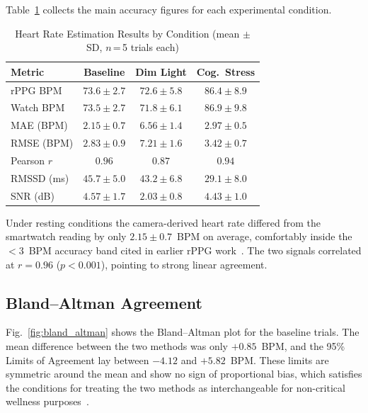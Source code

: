 \documentclass[conference]{IEEEtran}
\begin{document}
Table~\ref{tab:results} collects the main accuracy figures for each
experimental condition.

\begin{table}[!t]
  \centering
  \caption{Heart Rate Estimation Results by Condition
           (mean $\pm$ SD, $n$\,=\,5 trials each)}
  \label{tab:results}
  \renewcommand{\arraystretch}{1.3}
  \begin{tabular}{@{}lccc@{}}
    \toprule
    \textbf{Metric}
      & \textbf{Baseline}
      & \textbf{Dim Light}
      & \textbf{Cog.\ Stress} \\
    \midrule
    rPPG BPM
      & $73.6 \pm 2.7$
      & $72.6 \pm 5.8$
      & $86.4 \pm 8.9$ \\
    Watch BPM
      & $73.5 \pm 2.7$
      & $71.8 \pm 6.1$
      & $86.9 \pm 9.8$ \\
    MAE (BPM)
      & $2.15 \pm 0.7$
      & $6.56 \pm 1.4$
      & $2.97 \pm 0.5$ \\
    RMSE (BPM)
      & $2.83 \pm 0.9$
      & $7.21 \pm 1.6$
      & $3.42 \pm 0.7$ \\
    Pearson $r$
      & $0.96$
      & $0.87$
      & $0.94$ \\
    RMSSD (ms)
      & $45.7 \pm 5.0$
      & $43.2 \pm 6.8$
      & $29.1 \pm 8.0$ \\
    SNR (dB)
      & $4.57 \pm 1.7$
      & $2.03 \pm 0.8$
      & $4.43 \pm 1.0$ \\
    \bottomrule
  \end{tabular}
\end{table}

Under resting conditions the camera-derived heart rate differed
from the smartwatch reading by only $2.15 \pm 0.7$~BPM on average,
comfortably inside the $< 3$~BPM accuracy band cited in earlier
rPPG work~\cite{poh2011advancements}. The two signals correlated
at $r = 0.96$ ($p < 0.001$), pointing to strong linear
agreement.

\subsection{Bland--Altman Agreement}

Fig.~\ref{fig:bland_altman} shows the Bland--Altman plot for the
baseline trials. The mean difference between the two methods was
only $+0.85$~BPM, and the 95\% Limits of Agreement lay between
$-4.12$ and $+5.82$~BPM. These limits are symmetric around the
mean and show no sign of proportional bias, which satisfies the
conditions for treating the two methods as interchangeable for
non-critical wellness purposes~\cite{bland1986statistical}.
\end{document}
